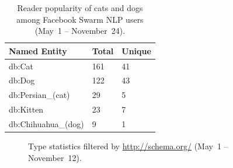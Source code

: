 \documentclass{iosart2c}
\begin{document}
\begin{table}
    \begin{tabular}{ | l | l | l |}
    \hline
	\textbf{Named Entity} & \textbf{Total} & \textbf{Unique} \\ \hline
	db:Cat & 161 & 41\\
	db:Dog & 122 & 43\\
	db:Persian\_(cat) &29 &5\\
	db:Kitten & 23 & 7\\
	db:Chihuahua\_(dog) & 9 & 1\\
    \hline
  \end{tabular}
  \caption{Reader popularity of cats and dogs among Facebook Swarm NLP users (May~1 -- November~24).}
  \label{tab:kittens}  
\end{table}

\begin{table}
  \centering
  \qquad
  \caption{Raw statistics on absolute, total and unique number of occurrences of named entities (May~1 -- November~12).}
  \label{tab:raw}
\end{table}

\begin{figure}
  \centering
    \qquad
\caption{Type statistics filtered by \url{http://schema.org/} (May~1 -- November~12).}
\label{fig:schema}
\end{figure}
\end{document}
